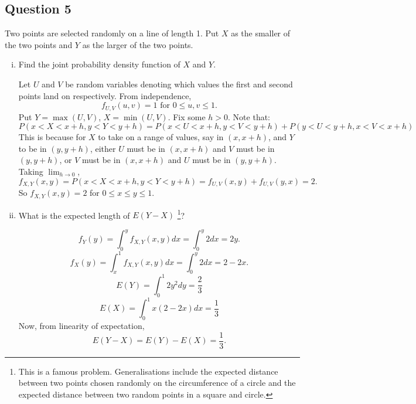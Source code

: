 \documentclass{article}
\begin{document}
\subsection*{Question 5}
Two points are selected randomly on a line of length 1. Put $X$ as the smaller of the two points and $Y$ as the larger of the two points. 
\begin{enumerate}[i)]
\item Find the joint probability density function of $X$ and $Y$.

Let $U$ and $V$ be random variables denoting which values the first and second points land on respectively. From independence,
\begin{equation*}
    f_{U,V}(u,v)=1 \text{  for } 0 \leq u,v \leq 1.
\end{equation*}
Put $Y=\max(U,V)$, $X=\min(U,V)$. Fix some $h>0$. Note that:
\begin{equation*}
    P(x < X < x+h, y< Y<y+h) = P(x < U < x+h, y< V<y+h) +P(y < U < y+h, x< V<x+h)
\end{equation*}
This is because for $X$ to take on a range of values, say in $(x, x+h)$, and $Y$ to be in $(y, y+h)$, either $U$ must be in $(x, x+h)$ and $V$ must be in $(y, y+h)$, or $V$ must be in $(x, x+h)$ and $U$ must be in $(y, y+h)$. Taking $\lim_{h \to 0}$,
\begin{equation*}
    f_{X,Y}(x,y) = P(x < X < x+h, y< Y<y+h) = f_{U,V}(x,y) + f_{U,V}(y,x) = 2.
\end{equation*}
So $f_{X,Y}(x,y) =2$ for $0\leq x \leq y \leq 1$.
\item What is the expected length of $E(Y-X)$ \footnote{This is a famous problem. Generalisations include the expected distance between two points chosen randomly on the circumference of a circle and the expected distance between two random points in a square and circle. }?

\begin{equation*}
    f_Y(y) = \int_0^y f_{X,Y}(x,y) dx = \int_0^y 2 dx = 2y.
\end{equation*}
\begin{equation*}
    f_X(y) = \int_x^1 f_{X,Y}(x,y) dx = \int_0^y 2 dx = 2-2x.
\end{equation*}
\begin{equation*}
    E(Y) = \int_0^1 2y^2 dy = \frac{2}{3}
\end{equation*}
\begin{equation*}
    E(X) = \int_0^1 x(2-2x) dx = \frac{1}{3}
\end{equation*}
Now, from linearity of expectation, 
\begin{equation*}
    E(Y-X)=E(Y)-E(X) = \frac{1}{3}.
\end{equation*}
\end{enumerate}
\end{document}
